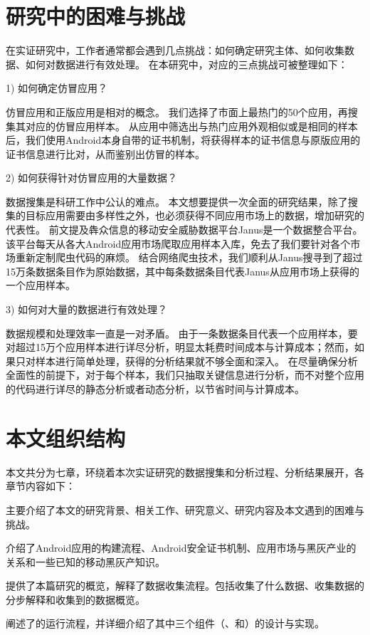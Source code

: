 \section{研究中的困难与挑战}
在实证研究中，工作者通常都会遇到几点挑战：如何确定研究主体、如何收集数据、如何对数据进行有效处理。
在本研究中，对应的三点挑战可被整理如下：

1)	如何确定仿冒应用？

仿冒应用和正版应用是相对的概念。
我们选择了市面上最热门的50个应用，再搜集其对应的仿冒应用样本。
从应用中筛选出与热门应用外观相似或是相同的样本后，我们使用Android本身自带的证书机制，将获得样本的证书信息与原版应用的证书信息进行比对，从而鉴别出仿冒的样本。

2)	如何获得针对仿冒应用的大量数据？

数据搜集是科研工作中公认的难点。
本文想要提供一次全面的研究结果，除了搜集的目标应用需要由多样性之外，也必须获得不同应用市场上的数据，增加研究的代表性。
前文提及犇众信息的移动安全威胁数据平台Janus是一个数据整合平台。该平台每天从各大Android应用市场爬取应用样本入库，免去了我们要针对各个市场重新定制爬虫代码的麻烦。
结合网络爬虫技术，我们顺利从Janus搜寻到了超过15万条数据条目作为原始数据，其中每条数据条目代表Janus从应用市场上获得的一个应用样本。

3)	如何对大量的数据进行有效处理？

数据规模和处理效率一直是一对矛盾。
由于一条数据条目代表一个应用样本，要对超过15万个应用样本进行详尽分析，明显太耗费时间成本与计算成本；然而，如果只对样本进行简单处理，获得的分析结果就不够全面和深入。
在尽量确保分析全面性的前提下，对于每个样本，我们只抽取关键信息进行分析，而不对整个应用的代码进行详尽的静态分析或者动态分析，以节省时间与计算成本。


\section{本文组织结构}
本文共分为七章，环绕着本次实证研究的数据搜集和分析过程、分析结果展开，各章节内容如下：

 主要介绍了本文的研究背景、相关工作、研究意义、研究内容及本文遇到的困难与挑战。

 介绍了Android应用的构建流程、Android安全证书机制、应用市场与黑灰产业的关系和一些已知的移动黑灰产知识。

 提供了本篇研究的概览，解释了数据收集流程。包括收集了什么数据、收集数据的分步解释和收集到的数据概览。

 阐述了\mytool 的运行流程，并详细介绍了其中三个组件（\componentA、\componentB 和\componentC）的设计与实现。

